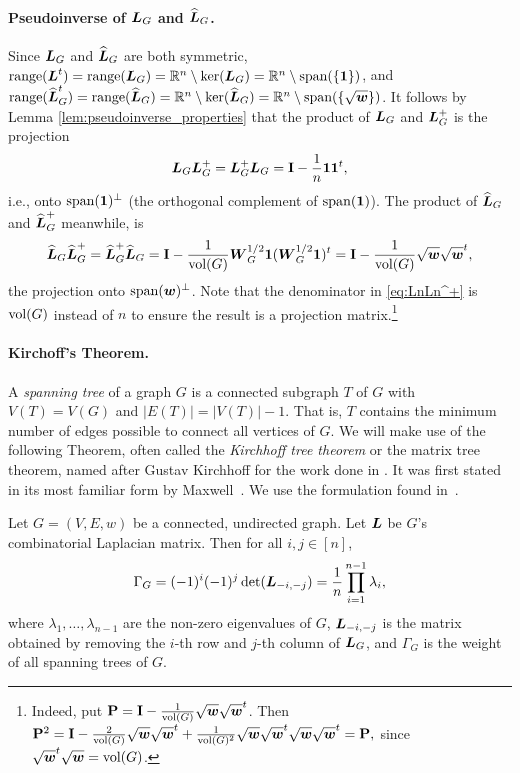 \paragraph{Pseudoinverse of \texorpdfstring{$\vb*{L}_G$}{the combinatorial} and \texorpdfstring{$\widehat{\vb*{L}}_G$}{normalized Laplacian}.}
Since $\vb*{L}_G$ and $\widehat{\vb*{L}}_G$ are both symmetric, $\textnormal{range}(\vb*{L}^t)=\textnormal{range}(\vb*{L}_G)=\mathbb{R}^n \setminus \ker(\vb*{L}_G)=\mathbb{R}^n \setminus \textnormal{span}(\{\vb{1}\})$, and $\textnormal{range}(\widehat{\vb*{L}}_G^t)=\textnormal{range}(\widehat{\vb*{L}}_G)=\mathbb{R}^n \setminus \ker(\widehat{\vb*{L}}_G)=\mathbb{R}^n \setminus \textnormal{span}(\{\sqrt{\vb*{w}}\})$. It follows by Lemma \ref{lem:pseudoinverse_properties} that the product of $\vb*{L}_G$ and $\vb*{L}_G^+$ is the projection
\begin{equation}
\label{eq:LL^+}
\vb*{L}_G\vb*{L}_G^+ = \vb*{L}_G^+\vb*{L}_G = \vb{I} - \frac{1}{n}\vb{1}\vb{1}^t,
\end{equation}
i.e., onto $\textnormal{span}(\vb{1})^\perp$ (the orthogonal  complement of  $\textnormal{span}(\vb{1})$). The product of $\widehat{\vb*{L}}_G$  and $\widehat{\vb*{L}}_G^+$ meanwhile, is 
\begin{equation}
\label{eq:LnLn^+}
\widehat{\vb*{L}}_G\widehat{\vb*{L}}_G^+ = \widehat{\vb*{L}}_G^+\widehat{\vb*{L}}_G = \vb{I} - \frac{1}{\textnormal{vol}(G)}\vb*{W}_G^{1/2}\vb{1}(\vb*{W}_G^{1/2}\vb{1})^t = \vb{I}-\frac{1}{\textnormal{vol}(G)}\sqrt{\vb*{w}}\sqrt{\vb*{w}}^t,
\end{equation}
the projection onto $\textnormal{span}(\vb*{w})^\perp$. Note that the denominator in \eqref{eq:LnLn^+} is $\textnormal{vol}(G)$ instead of $n$ to ensure the result is a projection matrix.\footnote{Indeed, put $\vb{P} = \vb{I}-\frac{1}{\textnormal{vol}(G)}\sqrt{\vb*{w}}\sqrt{\vb*{w}}^t$. Then 
$
\vb{P}^2 = \vb{I} - \frac{2}{\textnormal{vol}(G)}\sqrt{\vb*{w}}\sqrt{\vb*{w}}^t + \frac{1}{\textnormal{vol}(G)^2}\sqrt{\vb*{w}}\sqrt{\vb*{w}}^t\sqrt{\vb*{w}}\sqrt{\vb*{w}}^t = \vb{P},
$
since $\sqrt{\vb*{w}}^t\sqrt{\vb*{w}}= \textnormal{vol}(G)$.}



\paragraph{Kirchoff's  Theorem. }
A  \emph{spanning tree} of a graph $G$ is a connected subgraph $T$ of $G$ with $V(T)=V(G)$ and $|E(T)| = |V(T)|-1$. That  is, $T$ contains the minimum number of edges possible to connect all vertices of $G$.   
We will make use  of the following Theorem, often  called the \emph{Kirchhoff tree theorem} or the matrix tree theorem, named after Gustav Kirchhoff for the work done in \cite{Kirchhoff1847}. It was first stated in its most familiar form by Maxwell~\cite{maxwell1873treatise}. We use the formulation found in~\cite{chaiken1978matrix}. 

\begin{theorem}
	\label{thm:matrix_tree_theorem}
	Let $G=(V,E,w)$ be a connected, undirected graph. Let $\vb*{L}$ be $G$'s combinatorial Laplacian matrix. Then for all $i,j\in[n]$, 
	\[\Gamma_G = (-1)^i(-1)^j \det(\vb*{L}_{-i,-j}) = \frac{1}{n}\prod_{i=1}^{n-1} \lambda_i,\]
	where $\lambda_1,\dots,\lambda_{n-1}$ are the non-zero eigenvalues of $G$, $\vb*{L}_{-i,-j}$ is the matrix obtained by removing the $i$-th row and $j$-th column of $\vb*{L}_G$, and $\Gamma_G$ is the weight of all spanning trees of $G$.  
\end{theorem}

